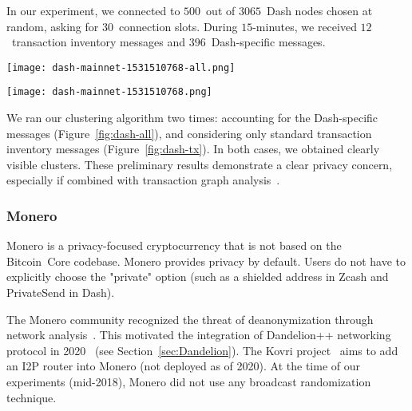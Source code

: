 In our experiment, we connected to $500$~out of $3065$~Dash nodes chosen at random, asking for $30$~connection slots.
During $15$-minutes, we received $12$~transaction inventory messages and $396$~Dash-specific messages.

\begin{figure*}
	\centering
	\begin{minipage}{0.5\textwidth}
		\centering
		\texttt{[image: dash-mainnet-1531510768-all.png]}
		\caption{Dash (Dash-specific messages and usual transactions)}
	\end{minipage}\hfill
	\begin{minipage}{0.5\textwidth}
		\centering
		\texttt{[image: dash-mainnet-1531510768.png]}
		\caption{Dash (usual transactions)}
	\end{minipage}\hfill
	\label{fig:dash-all}
\end{figure*}

We ran our clustering algorithm two times: accounting for the Dash-specific messages (Figure~\ref{fig:dash-all}), and considering only standard transaction inventory messages (Figure~\ref{fig:dash-tx}).
In both cases, we obtained clearly visible clusters.
These preliminary results demonstrate a clear privacy concern, especially if combined with transaction graph analysis~\cite{Kalodner2017}. 


\subsubsection{Monero}

Monero is a privacy-focused cryptocurrency that is not based on the Bitcoin~Core codebase.
Monero provides privacy by default.
Users do not have to explicitly choose the "private" option (such as a shielded address in Zcash and PrivateSend in Dash).

The Monero community recognized the threat of deanonymization through network analysis~\cite{user36432017, manontheinside2016, expez2016, Cameron2016}.
This motivated the integration of Dandelion++ networking protocol in 2020~\cite{ErCiccione2020} (see Section~\ref{sec:Dandelion}).
The Kovri project~\cite{Kovri} aims to add an I2P router into Monero (not deployed as of 2020).
At the time of our experiments (mid-2018), Monero did not use any broadcast randomization technique.

